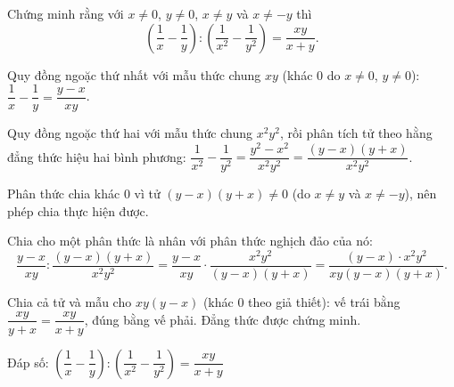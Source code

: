\begin{problem}[8DS-PS-017]
Chứng minh rằng với $x \neq 0$, $y \neq 0$, $x \neq y$ và $x \neq -y$ thì
\[ \left(\dfrac{1}{x} - \dfrac{1}{y}\right) : \left(\dfrac{1}{x^2} - \dfrac{1}{y^2}\right) = \dfrac{xy}{x + y}. \]

\begin{solution}
Quy đồng ngoặc thứ nhất với mẫu thức chung $xy$ (khác $0$ do $x \neq 0$, $y \neq 0$): $\dfrac{1}{x} - \dfrac{1}{y} = \dfrac{y - x}{xy}$.

Quy đồng ngoặc thứ hai với mẫu thức chung $x^2y^2$, rồi phân tích tử theo hằng đẳng thức hiệu hai bình phương: $\dfrac{1}{x^2} - \dfrac{1}{y^2} = \dfrac{y^2 - x^2}{x^2y^2} = \dfrac{(y - x)(y + x)}{x^2y^2}$.

Phân thức chia khác $0$ vì tử $(y - x)(y + x) \neq 0$ (do $x \neq y$ và $x \neq -y$), nên phép chia thực hiện được.

Chia cho một phân thức là nhân với phân thức nghịch đảo của nó:
\[ \dfrac{y - x}{xy} : \dfrac{(y - x)(y + x)}{x^2y^2} = \dfrac{y - x}{xy} \cdot \dfrac{x^2y^2}{(y - x)(y + x)} = \dfrac{(y - x) \cdot x^2y^2}{xy(y - x)(y + x)}. \]

Chia cả tử và mẫu cho $xy(y - x)$ (khác $0$ theo giả thiết): vế trái bằng $\dfrac{xy}{y + x} = \dfrac{xy}{x + y}$, đúng bằng vế phải. Đẳng thức được chứng minh.

Đáp số: $\boxed{\left(\dfrac{1}{x} - \dfrac{1}{y}\right) : \left(\dfrac{1}{x^2} - \dfrac{1}{y^2}\right) = \dfrac{xy}{x + y}}$
\end{solution}
\end{problem}

